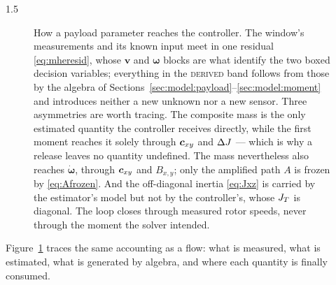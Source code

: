 \begin{spacing}{1.5}
\begin{figure}[tbp]
\caption{How a payload parameter reaches the controller. The window's
measurements and its known input meet in one residual \eqref{eq:mheresid}, whose
$\bm v$ and $\bm\omega$ blocks are what identify the two boxed decision
variables; everything in the \textsc{derived} band follows from those by the
algebra of Sections~\ref{sec:model:payload}--\ref{sec:model:moment} and
introduces neither a new unknown nor a new sensor. Three asymmetries are worth
tracing. The composite mass is the only estimated quantity the controller
receives directly, while the first moment reaches it solely through $\bm{c}_{xy}$ and
$\Delta J$ --- which is why a release leaves no quantity undefined. The mass
nevertheless also reaches $\dot{\bm\omega}$, through $\bm{c}_{xy}$ and $B_{x,y}$; only
the amplified path $A$ is frozen by \eqref{eq:Afrozen}. And the off-diagonal
inertia \eqref{eq:Jxz} is carried by the estimator's model but not by the
controller's, whose $J_T$ is diagonal. The loop closes through measured rotor
speeds, never through the moment the solver intended.}
\label{fig:paramflow}
\end{figure}

Figure~\ref{fig:paramflow} traces the same accounting as a flow: what is
measured, what is estimated, what is generated by algebra, and where each
quantity is finally consumed.



\end{spacing}
